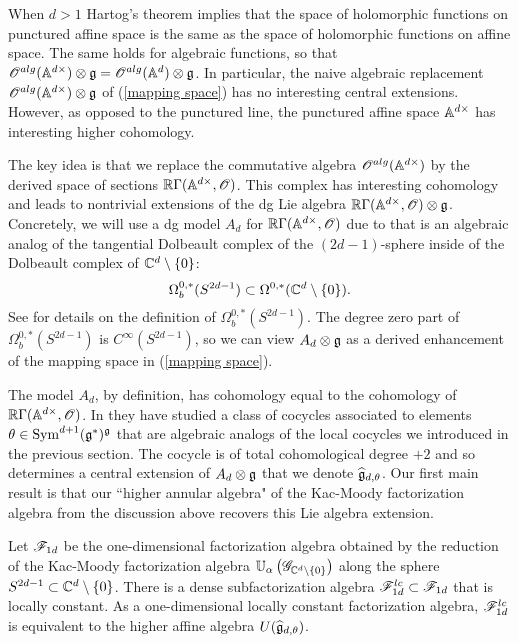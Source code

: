 \documentclass[10pt]{amsart}
\begin{document}
When $d > 1$ Hartog's theorem implies that the space of holomorphic functions on punctured affine space is the same as the space of holomorphic functions on affine space.
The same holds for algebraic functions, so that $\sO^{alg}(\AA^{d\times}) \tensor \fg = \sO^{alg}(\AA^d) \tensor \fg$. 
In particular, the naive algebraic replacement $\sO^{alg}(\AA^{d\times}) \tensor \fg$ of (\ref{mapping space}) has no interesting central extensions. 
However, as opposed to the punctured line, the punctured affine space $\AA^{d \times}$ has interesting higher cohomology. 

The key idea is that we replace the commutative algebra $\sO^{alg}(\AA^{d\times})$ by the derived space of sections $\RR \Gamma(\AA^{d \times}, \sO)$. 
This complex has interesting cohomology and leads to nontrivial extensions of the dg Lie algebra $\RR \Gamma(\AA^{d \times}, \sO) \tensor \fg$. 
Concretely, we will use a dg model $A_d$ for $\RR \Gamma(\AA^{d \times}, \sO)$ due to \cite{FHK} that is an algebraic analog of the tangential Dolbeault complex of the $(2d-1)$-sphere inside of the Dolbeault complex of $\CC^d \setminus \{0\}$:
\[
\Omega_b^{0,*}(S^{2d-1}) \subset \Omega^{0,*}(\CC^d\setminus \{0\}) .
\]
See \cite{DragomirTomassini} for details on the definition of $\Omega_b^{0,*}(S^{2d-1})$. 
The degree zero part of $\Omega_b^{0,*}(S^{2d-1})$ is $C^\infty(S^{2d-1})$, so we can view $A_d \tensor \fg$ as a derived enhancement of the mapping space in (\ref{mapping space}). 

The model $A_d$, by definition, has cohomology equal to the cohomology of $\RR \Gamma(\AA^{d \times}, \sO)$. 
In \cite{FHK} they have studied a class of cocycles associated to elements $\theta \in \Sym^{d+1}(\fg^*)^\fg$ that are algebraic analogs of the local cocycles we introduced in the previous section. 
The cocycle is of total cohomological degree $+2$ and so determines a central extension of $A_d \tensor \fg$ that we denote $\Hat{\fg}_{d,\theta}$. 
Our first main result is that our ``higher annular algebra" of the Kac-Moody factorization algebra from the discussion above recovers this Lie algebra extension.

\begin{thm}\label{thm sphere alg}
Let $\sF_{1d}$ be the one-dimensional factorization algebra obtained by the reduction of the Kac-Moody factorization algebra $\UU_\alpha\left(\sG_{\CC^{d} \setminus \{0\}} \right)$ along the sphere $S^{2d-1} \subset \CC^{d} \setminus \{0\}$.
There is a dense subfactorization algebra $\sF^{lc}_{1d} \subset \sF_{1d}$ that is locally constant. 
As a one-dimensional locally constant factorization algebra, $\sF^{lc}_{1d}$ is equivalent to the higher affine algebra $U(\Hat{\fg}_{d,\theta})$.
\end{thm}
\end{document}
